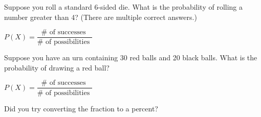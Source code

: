 \documentclass{ximera}
\begin{document}
\begin{question}
Suppose you roll a standard 6-sided die. What is the probability of rolling a number greater than 4? (There are multiple correct answers.)

    \begin{multipleChoice}
      \end{multipleChoice}
    \begin{hint}
    $P(X) = \dfrac{ \#\text{ of successes }}{ \#\text{ of possibilities } }$
    \end{hint}
\end{question}

\begin{question}
Suppose you have an urn containing 30 red balls and 20 black balls. What is the probability of drawing a red ball?

    \begin{multipleChoice}
      \end{multipleChoice}
    \begin{hint}
    $P(X) = \dfrac{ \#\text{ of successes }}{ \#\text{ of possibilities } }$
    \end{hint}
    \begin{hint}
    Did you try converting the fraction to a percent?
    \end{hint}

\end{question}
\end{document}
